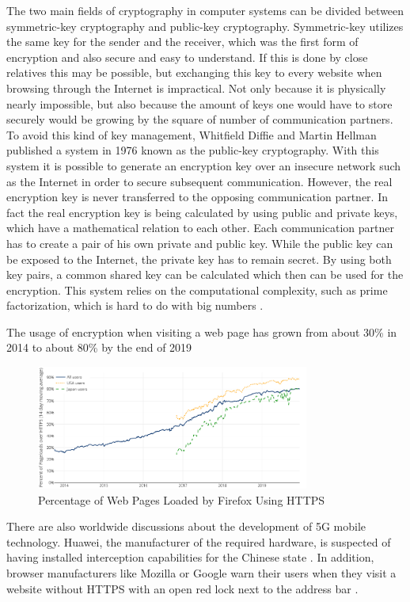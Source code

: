 \documentclass[12pt,oneside,a4paper,parskip]{scrbook}
\begin{document}
The two main fields of cryptography in computer systems can be divided between symmetric-key cryptography and public-key cryptography. Symmetric-key utilizes the same key for the sender and the receiver, which was the first form of encryption and also secure and easy to understand. If this is done by close relatives this may be possible, but exchanging this key to every website when browsing through the Internet is impractical. Not only because it is physically nearly impossible, but also because the amount of keys one would have to store securely would be growing by the square of number of communication partners.
To avoid this kind of key management, Whitfield Diffie and Martin Hellman published a system in 1976 known as the public-key cryptography. With this system it is possible to generate an encryption key over an insecure network such as the Internet in order to secure subsequent communication. However, the real encryption key is never transferred to the opposing communication partner. In fact the real encryption key is being calculated by using public and private keys, which have a mathematical relation to each other. Each communication partner has to create a pair of his own private and public key. While the public key can be exposed to the Internet, the private key has to remain secret. 
By using both key pairs, a common shared key can be calculated which then can be used for the encryption. This system relies on the computational complexity, such as prime factorization, which is hard to do with big numbers \parencite{luber_encryption_2017}.

The usage of encryption when visiting a web page has grown from about 30\% in 2014 to about 80\% by the end of 2019

\begin{figure}[ht]
	\centering
  \includegraphics[width=0.8\textwidth]{ressources/https_statistics.png}
	\caption{Percentage of Web Pages Loaded by Firefox Using HTTPS \parencite{letsencrypt_lets_2019}}
\end{figure}
\newpage
There are also worldwide discussions about the development of 5G mobile technology. Huawei, the manufacturer of the required hardware, is suspected of having installed interception capabilities for the Chinese state \parencite{stokel-walker_banning_2019}. \newline
In addition, browser manufacturers like Mozilla or Google warn their users when they visit a website without HTTPS with an open red lock next to the address bar \parencite{google_milestone_2018}.
\end{document}
